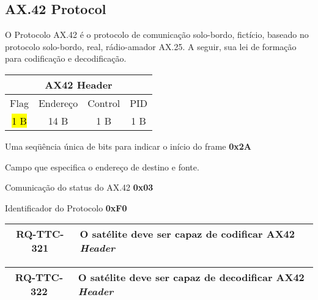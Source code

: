 \subsection{AX.42 Protocol}

O Protocolo AX.42 é o protocolo de comunicação solo-bordo, fictício, baseado no protocolo solo-bordo, real, rádio-amador AX.25.
A seguir, sua lei de formação para codificação e decodificação.

\begin{table}[H]
\centering
\begin{tabular}{|c|c|c|c|}
\hline
\multicolumn{4}{|c|}{AX42 Header} \\ \hline
Flag & Endereço & Control & PID \\ \hline
\hl{1 B} & 14 B & 1 B & 1 B \\ \hline
\end{tabular}%
\end{table}

\begin{description}[align=right]
    \item[Flag] Uma seqüência única de bits para indicar o início do frame \textbf{0x2A}
    \item[Endereço] Campo que especifica o endereço de destino e fonte.
    \item[Control] Comunicação do status do AX.42 \textbf{0x03}
    \item[PID] Identificador do Protocolo \textbf{0xF0}
\end{description}

\begin{table}[H]
    \centering
    \begin{tabular}{|c|p{}|}
        \hline
        \rowcolor{orange}
        \textbf{RQ-TTC-321} & \textbf{O satélite deve ser capaz de codificar AX42 \textit{Header}} \\ \hline
    \end{tabular}
    \label{tab:rq-ttc-321}
\end{table}

\begin{table}[H]
    \centering
    \begin{tabular}{|c|p{}|}
        \hline
        \rowcolor{orange}
        \textbf{RQ-TTC-322} & \textbf{O satélite deve ser capaz de decodificar AX42 \textit{Header}} \\ \hline
    \end{tabular}
    \label{tab:rq-ttc-322}
\end{table}

